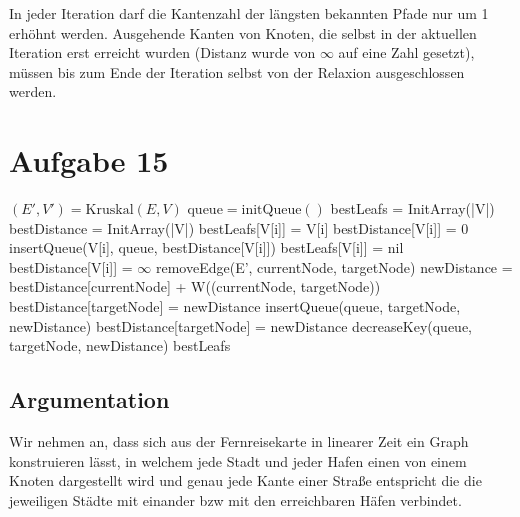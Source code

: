 \documentclass[parskip=half,a4paper]{scrartcl}
\begin{document}
In jeder Iteration darf die Kantenzahl der längsten bekannten Pfade nur um 1 erhöhnt werden. Ausgehende Kanten von Knoten, die selbst in der aktuellen Iteration erst erreicht wurden (Distanz wurde von $\infty$ auf eine Zahl gesetzt), müssen bis zum Ende der Iteration selbst von der Relaxion ausgeschlossen werden.


\section*{Aufgabe 15}


\begin{algorithmic}[1]
 
\State $(E',V') = \text{Kruskal}(E, V)$ 
\State $\text{queue} = \text{initQueue}()$
\State bestLeafs = InitArray(|V|)
\State bestDistance = InitArray(|V|)
 
 
\State bestLeafs[V[i]] = V[i]
\State bestDistance[V[i]] = 0
\State insertQueue(V[i], queue, bestDistance[V[i]]) 
\Else {}
\State bestLeafs[V[i]] = nil
\State bestDistance[V[i]] = $\infty$
\EndIf
\EndFor
{}  \label{outer} 
 \label{inner}
\State removeEdge(E', currentNode, targetNode)
\State newDistance = bestDistance[currentNode] + W((currentNode, targetNode))
\State bestDistance[targetNode] = newDistance
\State insertQueue(queue, targetNode, newDistance) 
\State bestDistance[targetNode] = newDistance
\State decreaseKey(queue, targetNode, newDistance) 
\EndIf
\EndWhile
\EndWhile
\Return bestLeafs
\EndProcedure
\end{algorithmic}


\subsection*{Argumentation}

Wir nehmen an, dass sich aus der Fernreisekarte in linearer Zeit ein Graph konstruieren lässt, in welchem jede Stadt und jeder Hafen einen von einem Knoten dargestellt wird und genau jede Kante einer Stra{\ss}e entspricht die die jeweiligen Städte mit einander bzw mit den erreichbaren Häfen verbindet.
\end{document}
